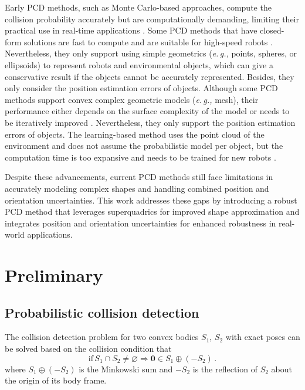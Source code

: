 \documentclass[conference]{IEEEtran}
\newcommand{\eg}[1]{\textit{e.\,g.,}{#1}}
\begin{document}
Early PCD methods, such as Monte Carlo-based approaches, compute the collision probability accurately but are computationally demanding, limiting their practical use in real-time applications \cite{lambert2008fast}. Some PCD methods that have closed-form solutions are fast to compute and are suitable for high-speed robots \cite{du2011probabilistic, park2018fast, zhu2019chance}. Nevertheless, they only support using simple geometrics (\eg{ points, spheres, or ellipsoids}) to represent robots and environmental objects, which can give a conservative result if the objects cannot be accurately represented. Besides, they only consider the position estimation errors of objects. Although some PCD methods support convex complex geometric models (\eg{ mesh}), their performance either depends on the surface complexity of the model \cite{park2020efficient} or needs to be iteratively improved \cite{dawson2020provably}. Nevertheless, they only support the position estimation errors of objects. The learning-based method uses the point cloud of the environment and does not assume the probabilistic model per object, but the computation time is too expansive and needs to be trained for new robots \cite{quintero2024stochastic}. 

Despite these advancements, current PCD methods still face limitations in accurately modeling complex shapes and handling combined position and orientation uncertainties. This work addresses these gaps by introducing a robust PCD method that leverages superquadrics for improved shape approximation and integrates position and orientation uncertainties for enhanced robustness in real-world applications.


\section{Preliminary}

\subsection{Probabilistic collision detection}
The collision detection problem for two convex bodies $S_1$, $S_2$ with exact poses can be solved based on the collision condition that
\begin{equation*}
\text{if}\,  S_1 \cap S_2 \neq \varnothing \Rightarrow \mathbf{0} \in S_1 \oplus (-S_2) \, .
\end{equation*}
where $S_1 \oplus (-S_2)$ is the Minkowski sum and $-S_2$ is the reflection of $S_2$ about the origin of its body frame.
\end{document}
